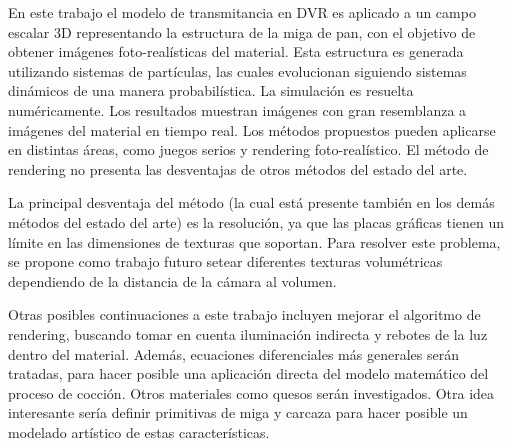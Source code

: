 \documentclass[oneside,a4paper,spanish,links]{amca}
\begin{document}
En este trabajo el modelo de transmitancia en DVR es aplicado a un campo escalar 3D representando la estructura de la miga de pan, con el objetivo de obtener im\'agenes foto-real\'isticas del material. Esta estructura es generada utilizando sistemas de part\'iculas, las cuales evolucionan siguiendo sistemas din\'amicos de una manera probabil\'istica. La simulaci\'on es resuelta num\'ericamente. Los resultados muestran im\'agenes con gran resemblanza a im\'agenes del material en tiempo real. Los m\'etodos propuestos pueden aplicarse en distintas \'areas, como juegos serios \citep{Susi2007} y rendering foto-real\'istico. El m\'etodo de rendering no presenta las desventajas de otros m\'etodos del estado del arte.

La principal desventaja del m\'etodo (la cual est\'a presente tambi\'en en los dem\'as m\'etodos del estado del arte) es la resoluci\'on, ya que las placas gr\'aficas tienen un l\'imite en las dimensiones de texturas que soportan. Para resolver este problema, se propone como trabajo futuro setear diferentes texturas volum\'etricas dependiendo de la distancia de la c\'amara al volumen.

Otras posibles continuaciones a este trabajo incluyen mejorar el algoritmo de rendering, buscando tomar en cuenta iluminaci\'on indirecta y rebotes de la luz dentro del material. Adem\'as, ecuaciones diferenciales m\'as generales ser\'an tratadas, para hacer posible una aplicaci\'on directa del modelo matem\'atico del proceso de cocci\'on. Otros materiales como quesos ser\'an investigados. Otra idea interesante ser\'ia definir primitivas de miga y carcaza para hacer posible un modelado art\'istico de estas caracter\'isticas. 

%

\end{document}
